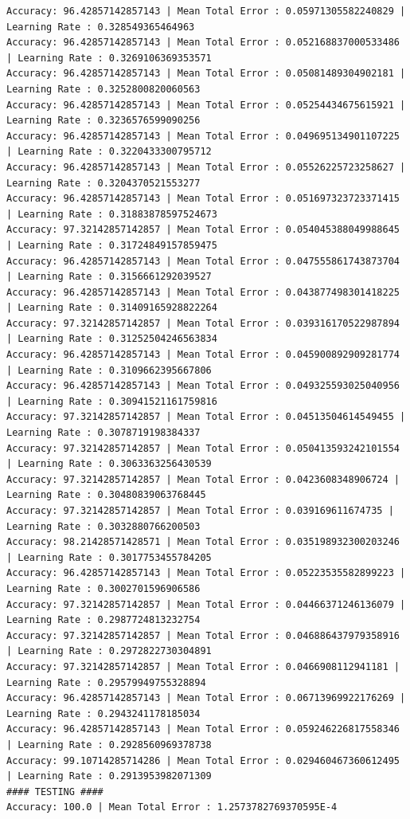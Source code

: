 \documentclass[]{report}
\begin{document}
\begin{verbatim}
Accuracy: 96.42857142857143 | Mean Total Error : 0.05971305582240829 | Learning Rate : 0.328549365464963
Accuracy: 96.42857142857143 | Mean Total Error : 0.052168837000533486 | Learning Rate : 0.3269106369353571
Accuracy: 96.42857142857143 | Mean Total Error : 0.05081489304902181 | Learning Rate : 0.3252800820060563
Accuracy: 96.42857142857143 | Mean Total Error : 0.05254434675615921 | Learning Rate : 0.3236576599090256
Accuracy: 96.42857142857143 | Mean Total Error : 0.049695134901107225 | Learning Rate : 0.3220433300795712
Accuracy: 96.42857142857143 | Mean Total Error : 0.05526225723258627 | Learning Rate : 0.3204370521553277
Accuracy: 96.42857142857143 | Mean Total Error : 0.051697323723371415 | Learning Rate : 0.31883878597524673
Accuracy: 97.32142857142857 | Mean Total Error : 0.054045388049988645 | Learning Rate : 0.31724849157859475
Accuracy: 96.42857142857143 | Mean Total Error : 0.047555861743873704 | Learning Rate : 0.3156661292039527
Accuracy: 96.42857142857143 | Mean Total Error : 0.043877498301418225 | Learning Rate : 0.31409165928822264
Accuracy: 97.32142857142857 | Mean Total Error : 0.039316170522987894 | Learning Rate : 0.31252504246563834
Accuracy: 96.42857142857143 | Mean Total Error : 0.045900892909281774 | Learning Rate : 0.3109662395667806
Accuracy: 96.42857142857143 | Mean Total Error : 0.049325593025040956 | Learning Rate : 0.30941521161759816
Accuracy: 97.32142857142857 | Mean Total Error : 0.04513504614549455 | Learning Rate : 0.3078719198384337
Accuracy: 97.32142857142857 | Mean Total Error : 0.050413593242101554 | Learning Rate : 0.3063363256430539
Accuracy: 97.32142857142857 | Mean Total Error : 0.0423608348906724 | Learning Rate : 0.30480839063768445
Accuracy: 97.32142857142857 | Mean Total Error : 0.039169611674735 | Learning Rate : 0.3032880766200503
Accuracy: 98.21428571428571 | Mean Total Error : 0.035198932300203246 | Learning Rate : 0.3017753455784205
Accuracy: 96.42857142857143 | Mean Total Error : 0.05223535582899223 | Learning Rate : 0.3002701596906586
Accuracy: 97.32142857142857 | Mean Total Error : 0.04466371246136079 | Learning Rate : 0.2987724813232754
Accuracy: 97.32142857142857 | Mean Total Error : 0.046886437979358916 | Learning Rate : 0.2972822730304891
Accuracy: 97.32142857142857 | Mean Total Error : 0.0466908112941181 | Learning Rate : 0.29579949755328894
Accuracy: 96.42857142857143 | Mean Total Error : 0.06713969922176269 | Learning Rate : 0.2943241178185034
Accuracy: 96.42857142857143 | Mean Total Error : 0.059246226817558346 | Learning Rate : 0.2928560969378738
Accuracy: 99.10714285714286 | Mean Total Error : 0.029460467360612495 | Learning Rate : 0.2913953982071309
#### TESTING ####
Accuracy: 100.0 | Mean Total Error : 1.2573782769370595E-4

\end{verbatim}
\end{document}
